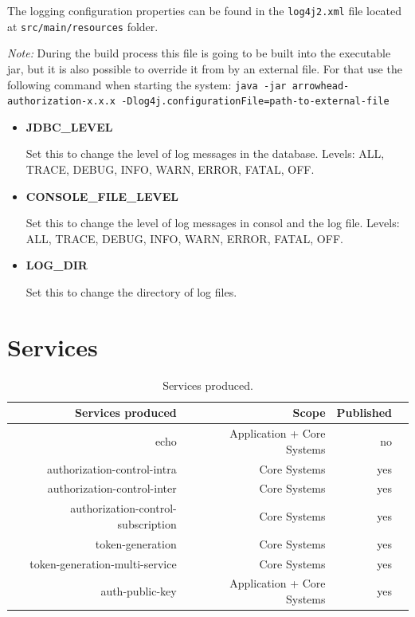 \documentclass[a4paper]{arrowhead}
\begin{document}
The logging configuration properties can be found in the \texttt{log4j2.xml} file located at \texttt{src/main/resources} folder.

\textit{Note:} During the build process this file is going to be built into the executable jar, but it is also possible to override it from by an external file. For that use the following command when starting the system: \texttt{java -jar arrowhead-authorization-x.x.x -Dlog4j.configurationFile={path-to-external-file}}

\begin{itemize}
    \item \textbf{JDBC\_LEVEL}
    
    Set this to change the level of log messages in the database. Levels: ALL, TRACE, DEBUG, INFO, WARN, ERROR, FATAL, OFF.
    
    \item \textbf{CONSOLE\_FILE\_LEVEL}
    
    Set this to change the level of log messages in consol and the log file. Levels: ALL, TRACE, DEBUG, INFO, WARN, ERROR, FATAL, OFF.
    
    \item \textbf{LOG\_DIR}
    
    Set this to change the directory of log files.
\end{itemize}
  
\newpage

\section{Services}
\label{sec:services}

\begin{table}[ht!]
  \centering
  \caption{Services produced. }
  \label{tab:services}
  \begin{tabular}{|r|r|r|r|}
    \hline
    \rowcolor{gray!33}\textbf{Services produced} & \textbf{Scope} & \textbf{Published} \\
    \hline
 
    echo & Application + Core Systems & no  \\ \hline
    authorization-control-intra & Core Systems & yes \\ \hline
    authorization-control-inter & Core Systems & yes \\ \hline
    authorization-control-subscription & Core Systems & yes \\ \hline
    token-generation & Core Systems & yes \\ \hline
    token-generation-multi-service & Core Systems & yes \\ \hline
    auth-public-key & Application + Core Systems & yes \\ \hline
  \end{tabular}
\end{table}
\end{document}
